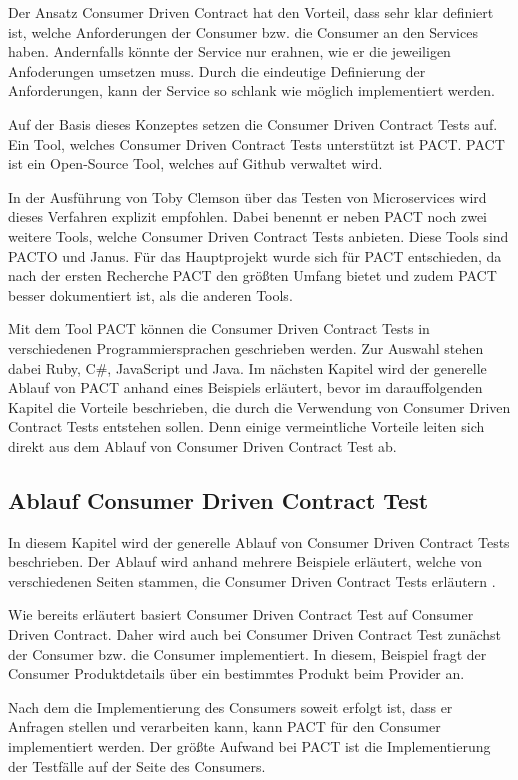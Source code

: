 \documentclass{llncs}
\begin{document}
Der Ansatz Consumer Driven Contract hat den Vorteil, dass sehr klar definiert ist, welche Anforderungen der Consumer bzw. die Consumer an den Services haben. Andernfalls könnte der Service nur erahnen, wie er die jeweiligen Anfoderungen umsetzen muss. Durch die eindeutige Definierung der Anforderungen, kann der Service so schlank wie möglich implementiert werden.   

Auf der Basis dieses Konzeptes setzen die Consumer Driven Contract Tests auf. Ein Tool, welches Consumer Driven Contract Tests unterstützt ist PACT. PACT ist ein Open-Source Tool, welches auf Github verwaltet wird.

In der Ausführung von Toby Clemson über das Testen von Microservices wird dieses Verfahren explizit empfohlen. Dabei benennt er neben PACT noch zwei weitere Tools, welche Consumer Driven Contract Tests anbieten. Diese Tools sind PACTO und Janus. Für das Hauptprojekt wurde sich für PACT entschieden, da nach der ersten Recherche PACT den größten Umfang bietet und zudem PACT besser dokumentiert ist, als die anderen Tools.

Mit dem Tool PACT können die Consumer Driven Contract Tests in verschiedenen Programmiersprachen geschrieben werden. Zur Auswahl stehen dabei Ruby, C\#, JavaScript und Java. Im nächsten Kapitel wird der generelle Ablauf von PACT anhand eines Beispiels erläutert, bevor im darauffolgenden Kapitel die Vorteile beschrieben, die durch die Verwendung von Consumer Driven Contract Tests entstehen sollen. Denn einige vermeintliche Vorteile leiten sich direkt aus dem Ablauf von Consumer Driven Contract Test ab.

\subsection{Ablauf Consumer Driven Contract Test}
In diesem Kapitel wird der generelle Ablauf von Consumer Driven Contract Tests beschrieben. Der Ablauf wird anhand mehrere Beispiele erläutert, welche von verschiedenen Seiten stammen, die Consumer Driven Contract Tests erläutern \cite{bayer2015jaxcenter, vitz2016inno, Vincent2015}.

Wie bereits erläutert basiert Consumer Driven Contract Test auf Consumer Driven Contract. Daher wird auch bei Consumer Driven Contract Test zunächst der Consumer bzw. die Consumer implementiert. In diesem, Beispiel fragt der Consumer Produktdetails über ein bestimmtes Produkt beim Provider an.

Nach dem die Implementierung des Consumers soweit erfolgt ist, dass er Anfragen stellen und verarbeiten kann, kann PACT für den Consumer implementiert werden. Der größte Aufwand bei PACT ist die Implementierung der Testfälle auf der Seite des Consumers.
\end{document}
